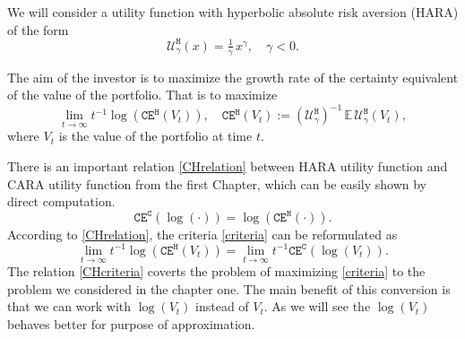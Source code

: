 We will consider a utility function with hyperbolic absolute risk aversion (HARA) of the form
\begin{equation}
\label{HARAutility}
\mathcal{U}^{\texttt{H}}_{\gamma}(x)=\tfrac{1}{\gamma}\,x^{\gamma}, \quad \gamma<0.
\end{equation}

The aim of the investor is to maximize the growth rate of the certainty equivalent of the value of the portfolio. That is to maximize 
\begin{equation}
\label{criteria}
\lim_{t\rightarrow\infty}t^{-1}\log(\texttt{CE}^{\texttt{H}}(V_t)),\quad \texttt{CE}^{\texttt{H}}(V_t):=(\mathcal{U}^{\texttt{H}}_{\gamma})^{-1}\,\mathbb{E}\,\mathcal{U}^{\texttt{H}}_{\gamma}(V_t),
\end{equation}
where $V_t$ is the value of the portfolio at time $t$.

There is an important relation \eqref{CHrelation} between HARA utility function and CARA utility function from the first Chapter, which can be easily shown by direct computation.
\begin{equation}
\label{CHrelation}
\texttt{CE}^{\texttt{C}}(\log(\cdot))=\log(\texttt{CE}^{\texttt{H}}(\cdot)).
\end{equation}
According to \eqref{CHrelation}, the criteria \eqref{criteria} can be reformulated as
\begin{equation}
\label{CHcriteria}
\lim_{t\rightarrow\infty}t^{-1}\log(\texttt{CE}^{\texttt{H}}(V_t)) =\lim_{t\rightarrow\infty}t^{-1}\texttt{CE}^{\texttt{C}}(\log(V_t)).
\end{equation}
The relation \eqref{CHcriteria} coverts the problem of maximizing \eqref{criteria} to the problem we considered in the chapter one. The main benefit of this conversion is that we can work with $\log(V_t)$ instead of $V_t$. As we will see the $\log(V_t)$ behaves better for purpose of approximation.

